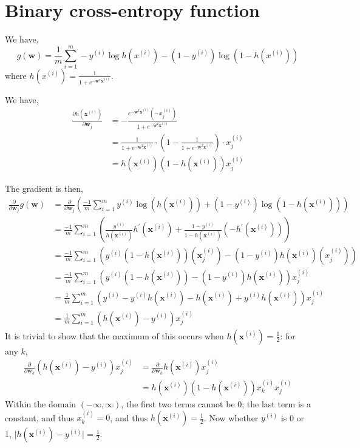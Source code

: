 \documentclass{article}
\begin{document}
\section{Binary cross-entropy function}
We have,
\[
    g(\textbf{w}) = \frac{1}{m}\sum\limits_{i=1}^m -y^{(i)}\log h(x^{(i)}) - (1-y^{(i)})\log \left( 1 - h(x^{(i)}) \right) 
\]
where $h(x^{(i)}) = \frac{1}{1+e^{-\textbf{w}^T \textbf{x}^{(i)}}}$.

We have,
\[
    \begin{aligned}
        \frac{\partial h(\textbf{x}^{(i)})}{\partial \textbf{w}_j} &= -\frac{e^{-\textbf{w}^T \textbf{x}^{(i)}} \left( -x^{(i)}_j \right)}{1+e^{-\textbf{w}^T \textbf{x}^{(i)}}} \\
        &= \frac{1}{1+e^{-\textbf{w}^T \textbf{x}^{(i)}}}\cdot \left( 1 - \frac{1}{1+e^{-\textbf{w}^T \textbf{x}^{(i)}}} \right) \cdot x^{(i)}_j \\
        &= h(\textbf{x}^{(i)}) \left( 1 - h(\textbf{x}^{(i)}) \right)x^{(i)}_j
    \end{aligned}
\]

The gradient is then,
\[
    \begin{aligned} \frac{\partial}{\partial \textbf{w}_j} g(\textbf{w}) &= \frac{\partial}{\partial \textbf{w}_j} \left( \frac{-1}{m} \sum_{i = 1}^m y^{(i)} \log \left( h(\textbf{x}^{(i)}) \right) + (1 - y^{(i)}) \log \left( 1 - h(\textbf{x}^{(i)}) \right) \right) \\ 
    &= \frac{-1}{m} \sum_{i = 1}^m \left( \frac{y^{(i)}}{h(\textbf{x}^{(i)})}h^{\prime}(\textbf{x}^{(i)}) + \frac{1 - y^{(i)}}{1 - h(\textbf{x}^{(i)})}(-h^{\prime}(\textbf{x}^{(i)})) \right) \\ 
    &= \frac{-1}{m} \sum_{i = 1}^m \left( y^{(i)}(1 - h(\textbf{x}^{(i)}))(\textbf{x}^{(i)}_j) - (1 - y^{(i)})h(\textbf{x}^{(i)})(x^{(i)}_j) \right) \\ 
    &= \frac{-1}{m} \sum_{i = 1}^m \left( y^{(i)}(1 - h(\textbf{x}^{(i)})) - (1 - y^{(i)})h(\textbf{x}^{(i)}) \right)x^{(i)}_j \\ 
    &= \frac{1}{m} \sum_{i = 1}^m \left( y^{(i)} - y^{(i)}h(\textbf{x}^{(i)}) - h(\textbf{x}^{(i)}) + y^{(i)}h(\textbf{x}^{(i)}) \right)x^{(i)}_j \\ 
    &= \frac{1}{m} \sum_{i = 1}^m \left( h(\textbf{x}^{(i)}) - y^{(i)} \right)x^{(i)}_j \end{aligned}
\]
It is trivial to show that the maximum of this occurs when $h(\textbf{x}^{(i)})=\frac{1}{2}$: for any $k$,
\[
    \begin{aligned}
        \frac{\partial}{\partial \textbf{w}_k} \left( h(\textbf{x}^{(i)}) - y^{(i)} \right)x^{(i)}_j &= \frac{\partial}{\partial \textbf{w}_k} h(\textbf{x}^{(i)})x^{(i)}_j \\
        &= h(\textbf{x}^{(i)})\left(1-h(\textbf{x}^{(i)}) \right)x^{(i)}_k x^{(i)}_j
    \end{aligned}
\]
Within the domain $(-\infty, \infty)$, the first two terms cannot be 0; the last term is a constant, and thus $x^{(i)}_k = 0$, and thus $h(\textbf{x}^{(i)}) = \frac{1}{2}$. Now whether $y^{(i)}$  is 0 or 1, $\lvert h(\textbf{x}^{(i)}) - y^{(i)} \rvert = \frac{1}{2}$.
\end{document}
